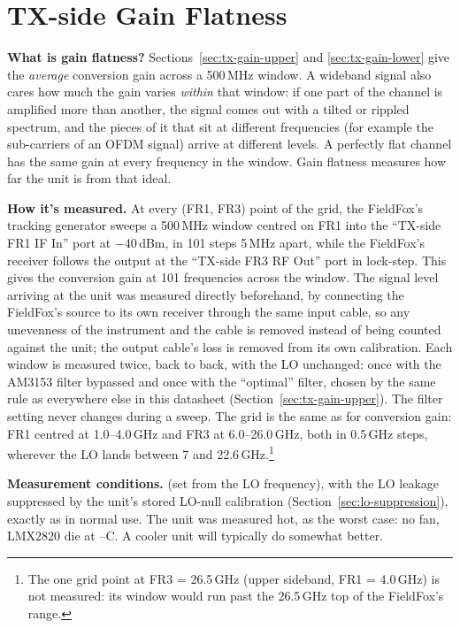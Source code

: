 \clearpage
\section{TX-side Gain Flatness}
\label{sec:tx-flatness}
\raggedbottom%


\textbf{What is gain flatness?} Sections~\ref{sec:tx-gain-upper} and \ref{sec:tx-gain-lower} give the
\emph{average} conversion gain across a 500\,MHz window. A wideband signal also cares how much the gain varies
\emph{within} that window: if one part of the channel is amplified more than another, the signal comes out with a
tilted or rippled spectrum, and the pieces of it that sit at different frequencies (for example the sub-carriers of
an OFDM signal) arrive at different levels. A perfectly flat channel has the same gain at every frequency in the
window. Gain flatness measures how far the unit is from that ideal.

\textbf{How it's measured.} At every (FR1, FR3) point of the grid, the FieldFox's tracking generator sweeps a
500\,MHz window centred on FR1 into the ``TX-side FR1 IF In'' port at −40\,dBm, in 101 steps 5\,MHz apart, while
the FieldFox's receiver follows the output at the ``TX-side FR3 RF Out'' port in lock-step. This gives the
conversion gain at 101 frequencies across the window. The signal level arriving at the unit was measured directly
beforehand, by connecting the FieldFox's source to its own receiver through the same input cable, so any unevenness
of the instrument and the cable is removed instead of being counted against the unit; the output cable's loss is
removed from its own calibration. Each window is measured twice, back to back, with the LO unchanged: once with the
AM3153 filter bypassed and once with the ``optimal'' filter, chosen by the same rule as everywhere else in this
datasheet (Section~\ref{sec:tx-gain-upper}). The filter setting never changes during a sweep. The grid is the same as
for conversion gain: FR1 centred at 1.0--4.0\,GHz and FR3 at 6.0--26.0\,GHz, both in 0.5\,GHz steps, wherever the
LO lands between 7 and 22.6\,GHz.\footnote{The one grid point at FR3 = 26.5\,GHz (upper sideband, FR1 = 4.0\,GHz) is
not measured: its window would run past the 26.5\,GHz top of the FieldFox's range.}

\textbf{Measurement conditions.} \lmxDriveRule{} (set from the LO frequency), with the LO leakage suppressed by the unit's stored LO-null calibration (Section~\ref{sec:lo-suppression}), exactly as in normal use. The unit was measured hot, as the worst case: no fan, LMX2820 die at \condFlatMinC--\condFlatMaxC\textdegree C. A cooler unit will typically do somewhat better.

